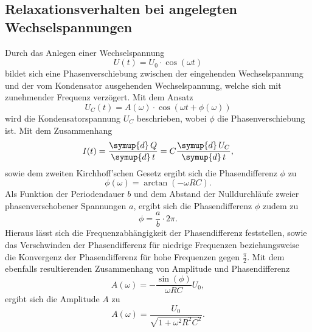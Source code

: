 \subsection{Relaxationsverhalten bei angelegten Wechselspannungen}
    Durch das Anlegen einer Wechselspannung 
    \begin{equation}
        \label{eqn:Wechselspannung}
        U(t) = U_0 \cdot \cos(\omega t)
    \end{equation}
    bildet sich eine Phasenverschiebung zwischen der eingehenden Wechselspannung und der vom Kondensator 
    ausgehenden Wechselspannung, welche sich mit zunehmender Frequenz verzögert. Mit dem Ansatz 
    \begin{equation}
        \label{eqn:Kondensatorspannung}
        U_C (t) = A(\omega) \cdot \cos(\omega t + \phi(\omega))
    \end{equation}
    wird die Kondensatorspannung $U_C$ beschrieben, wobei $\phi$ die Phasenverschiebung ist.
    Mit dem Zusammenhang
    \begin{equation}
        \label{eqn:stromstaerke}
        I(t) = \frac{\symup{d} \, Q} {\symup{d} \, t} = C \frac{\symup{d} \, U_C} {\symup{d} \, t},
    \end{equation}
    sowie dem zweiten Kirchhoff'schen Gesetz ergibt sich die Phasendifferenz $\phi$ zu 
    \begin{equation}
        \label{eqn:phasendifferenz}
        \phi(\omega) = \arctan (-\omega R C).
    \end{equation}
    Als Funktion der Periodendauer $b$ und dem Abstand der Nulldurchläufe zweier phasenverschobener Spannungen $a$, ergibt sich die Phasendifferenz $\phi$
    zudem zu
    \begin{equation}
        \label{eqn:phasenmessung}
        \phi = \frac {a}{b} \cdot 2 \pi.
    \end{equation}
    Hieraus lässt sich die Frequenzabhängigkeit der Phasendifferenz feststellen, sowie das Verschwinden der Phasendifferenz für niedrige 
    Frequenzen beziehungsweise die Konvergenz der Phasendifferenz für hohe Frequenzen gegen $\frac{\pi}{2}$.
    Mit dem ebenfalls resultierenden Zusammenhang von Amplitude und Phasendifferenz
    \begin{equation}
        \label{eqn:zusammenhang}
        A(\omega) = - \frac {\sin(\phi)}{\omega R C} U_0,
    \end{equation}
    ergibt sich die Amplitude $A$ zu
    \begin{equation}
    \label{eqn:amplitude}
    A(\omega) = \frac{U_0}{\sqrt{1 + \omega^2 R^2 C^2}}.
    \end{equation}

